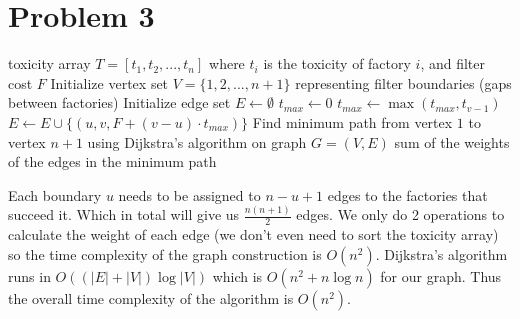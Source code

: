 \documentclass[11pt]{article}
\begin{document}
\section{Problem 3}
\begin{algorithm}
\caption{Convert to graph then solve with Dijkstra's algorithm}
\begin{algorithmic}[1]
\Require toxicity array $T = [t_1, t_2, ..., t_n]$ where $t_i$ is the toxicity of factory $i$, and filter cost $F$
\State Initialize vertex set $V = \{1, 2, ..., n+1\}$ representing filter boundaries (gaps between factories)
\State Initialize edge set $E \gets \emptyset$
    \State $t_{max} \gets 0$
        \State $t_{max} \gets \max(t_{max}, t_{v-1})$
        \State $E \gets E \cup \{(u, v, F + (v - u) \cdot t_{max})\}$ 
    \EndFor
\EndFor
\State Find minimum path from vertex $1$ to vertex $n+1$ using Dijkstra's algorithm on graph $G=(V,E)$
\State \Return sum of the weights of the edges in the minimum path
\end{algorithmic}
\end{algorithm}



Each boundary $u$ needs to be assigned to $n - u + 1$ edges to the factories that succeed it. 
Which in total will give us
$\frac{n(n+1)}{2}$ edges. We only do 2 operations to calculate the weight of each edge 
(we don't even need to sort the toxicity array) so the time complexity of the graph construction is $O(n^2)$. 
Dijkstra's algorithm runs in $O((|E| + |V|)\log|V|)$ which is $O(n^2 + n\log n)$ for our graph. 
Thus the overall time complexity of the algorithm is $O(n^2)$.

\end{document}
